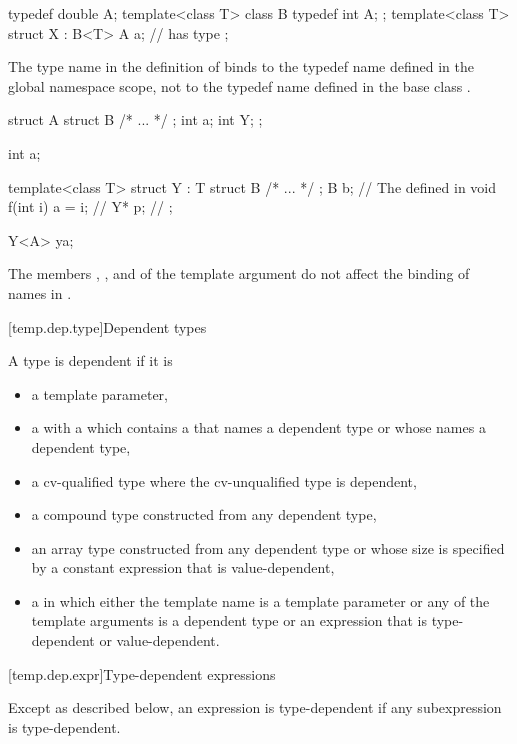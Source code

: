 \begin{codeblock}
typedef double A;
template<class T> class B {
	typedef int A;
};
template<class T> struct X : B<T> {
	A a;			//  has type 
};
\end{codeblock}

The type name
in the definition of
binds to the typedef name defined in the global
namespace scope, not to the typedef name
defined in the base class
.
\exitexample
\enterexample

\begin{codeblock}
struct A {
	struct B { /* ... */ };
	int a;
	int Y;
};

int a;

template<class T> struct Y : T {
	struct B { /* ... */ };
	B b;				// The  defined in 
	void f(int i) { a = i; }	// 
	Y* p;				// 
};

Y<A> ya;
\end{codeblock}

The members
,
,
and
of the template argument
do not affect the binding of names in
.
\exitexample

[temp.dep.type]{Dependent types}

\pnum
A type is dependent if it is
\begin{itemize}
\item
a template parameter,
\item
a  with a 
which contains a  that names a dependent type or
whose  names a dependent type,
\item
a cv-qualified type where the cv-unqualified type is dependent,
\item
a compound type constructed from any dependent type,
\item
an array type constructed from any dependent type or whose
size is specified by a constant expression that is value-dependent,
\item
a
in which either the template name is a template parameter or any of the
template arguments is a dependent type or an expression that is type-dependent
or value-dependent.
\end{itemize}

[temp.dep.expr]{Type-dependent expressions}

\pnum
Except as described below, an expression is type-dependent if any
subexpression is type-dependent.

